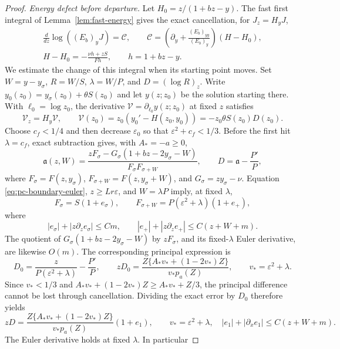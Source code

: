 \begin{proof}
\medskip\noindent\textit{Energy defect before departure.}\quad
Let $H_0=z/(1+bz-y)$. The fast first integral of
Lemma~\ref{lem:fast-energy} gives the exact cancellation, for
$J_z=H_yJ$,
\begin{equation}
\label{eq:pc-energy-defect}
 \begin{gathered}
 \frac d{dz}\log((E_b)_yJ)=\mathcal C,\qquad
 \mathcal C=\left(\partial_y+\frac{(E_b)_{yy}}{(E_b)_y}\right)(H-H_0),\\
 H-H_0=-\frac{\nu h+zS}{Fh},\qquad h=1+bz-y.
 \end{gathered}
\end{equation}
We estimate the change of this integral when its starting point moves.
Set $W=y-y_\sigma$, $R=W/S$, $\lambda=W/P$, and
$D=(\log R)_z$.
Write $y_0(z_0)=y_\sigma(z_0)+\theta S(z_0)$ and let
$y(z;z_0)$ be the solution starting there. With $\ell_0=\log z_0$,
the derivative $\mathcal V=\partial_{\ell_0}y(z;z_0)$ at fixed $z$
satisfies
\[
 \mathcal V_z=H_y\mathcal V,\qquad
 \mathcal V(z_0)=z_0(y_0'-H(z_0,y_0))=-z_0\theta S(z_0)D(z_0).
\]
Choose $c_f<1/4$ and then decrease $\varepsilon_0$ so that
$\varepsilon^2+c_f<1/3$. Before the first hit $\lambda=c_f$, exact
subtraction gives, with $A_*=-a\ge0$,
\[
 \mathfrak a(z,W)=
 \frac{zF_\sigma-G_\sigma(1+bz-2y_\sigma-W)}
      {F_\sigma F_{\sigma+W}},\qquad
 D=\mathfrak a-\frac{P'}P,
\]
where $F_\sigma=F(z,y_\sigma)$,
$F_{\sigma+W}=F(z,y_\sigma+W)$, and
$G_\sigma=zy_\sigma-\nu$.  Equation
\eqref{eq:pc-boundary-euler}, $z\ge Lr\varepsilon$, and
$W=\lambda P$ imply, at fixed $\lambda$,
\[
 F_\sigma=S(1+e_\sigma),\qquad
 F_{\sigma+W}=P(\varepsilon^2+\lambda)
       (1+e_+),
\]
where
\[
 |e_\sigma|+|z\partial_ze_\sigma|\le Cm,\qquad
 |e_+|+|z\partial_ze_+|\le C(z+W+m).
\]
The quotient of
$G_\sigma(1+bz-2y_\sigma-W)$ by $zF_\sigma$, and its fixed-$\lambda$
Euler derivative, are likewise $O(m)$.
The corresponding principal expression is
\[
 D_0=\frac{z}{P(\varepsilon^2+\lambda)}-\frac{P'}P,\qquad
 zD_0=\frac{Z\{A_*v_*+(1-2v_*)Z\}}
                 {v_*p_a(Z)},\qquad v_*=\varepsilon^2+\lambda.
\]
Since $v_*<1/3$ and
$A_*v_*+(1-2v_*)Z\ge A_*v_*+Z/3$, the principal difference cannot
be lost through cancellation.  Dividing the exact error by $D_0$
therefore yields
\begin{equation}
\label{eq:pc-growing-ratio}
 zD=\frac{Z\{A_*v_*+(1-2v_*)Z\}}
                {v_*p_a(Z)}(1+e_1),\qquad
 v_*=\varepsilon^2+\lambda,\quad
 |e_1|+|\partial_xe_1|\le C(z+W+m).
\end{equation}
The Euler derivative holds at fixed $\lambda$. In particular

\end{proof}
